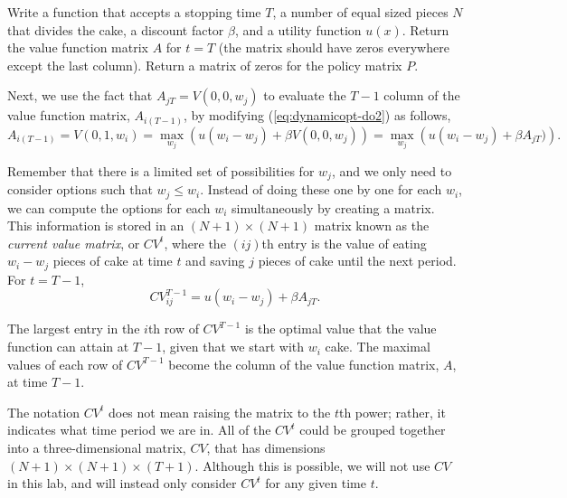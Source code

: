 \begin{problem}
Write a function that accepts a stopping time $T$, a number of equal sized pieces $N$ that divides the cake, a discount factor $\beta$, and a utility function $u(x)$.
Return the value function matrix $A$ for $t=T$ (the matrix should have zeros everywhere except the last column).
Return a matrix of zeros for the policy matrix $P$.
\label{prob:dynamicopt-eat-cake}
\end{problem}

Next, we use the fact that $A_{jT} = V(0,0,w_j)$ to evaluate the $T-1$ column of the value function matrix, $A_{i(T-1)}$, by modifying  (\ref{eq:dynamicopt-do2}) as follows,
\begin{equation}\label{eq:dynamicopt-do3}
A_{i(T-1)} = V(0, 1, w_{i}) = \max_{w_j}\left(u(w_{i} - w_{j}) + \beta V(0,0,w_{j})\right) = \max_{w_j}\left(u(w_{i} - w_{j}) + \beta A_{jT})\right).
\end{equation}

Remember that there is a limited set of possibilities for $w_j$, and we only need to consider options such that $w_j \leq w_i$.
Instead of doing these one by one for each $w_i$, we can compute the options for each $w_i$ simultaneously by creating a matrix.
This information is stored in an $(N+1) \times (N+1)$ matrix known as the \emph{current value matrix}, or $CV^t$, where the $(ij)$th entry is the value of eating $w_i-w_j$ pieces of cake at time $t$ and saving $j$ pieces of cake until the next period.
For $t = T-1$,
\begin{equation}\label{eq:dynamicopt-do4}
CV^{T-1}_{ij} = u(w_i - w_j) + \beta A_{jT}.
\end{equation}

The largest entry in the $i$th row of $CV^{T-1}$ is the optimal value that the value function can attain at $T-1$, given that we start with $w_i$ cake.
The maximal values of each row of $CV^{T-1}$ become the column of the value function matrix, $A$, at time $T-1$.

\begin{warn}
The notation $CV^t$ does not mean raising the matrix to the $t$th power; rather, it indicates what time period we are in.
All of the $CV^t$ could be grouped together into a three-dimensional matrix, $CV$, that has dimensions $(N+1) \times (N+1) \times (T+1)$.
Although this is possible, we will not use $CV$ in this lab, and will instead only consider $CV^t$ for any given time $t$.
\end{warn}

